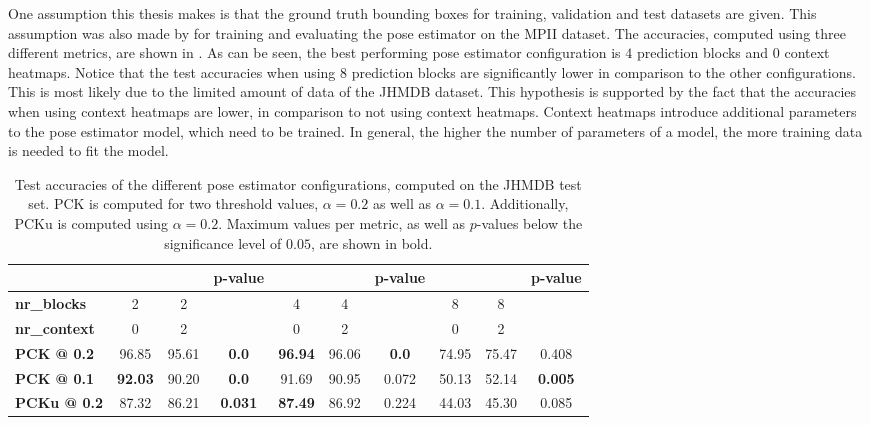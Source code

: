 One assumption this thesis makes is that the ground truth bounding boxes for training, validation and test datasets are given.
This assumption was also made by \cite{luvizon_2d/3d_2018} for training and evaluating the pose estimator on the MPII dataset.
The accuracies, computed using three different metrics, are shown in .
As can be seen, the best performing pose estimator configuration is $4$ prediction blocks and $0$ context heatmaps.
Notice that the test accuracies when using $8$ prediction blocks are significantly lower in comparison to the other configurations.
This is most likely due to the limited amount of data of the JHMDB dataset.
This hypothesis is supported by the fact that the accuracies when using context heatmaps are lower, in comparison to not using context heatmaps.
Context heatmaps introduce additional parameters to the pose estimator model, which need to be trained.
In general, the higher the number of parameters of a model, the more training data is needed to fit the model.

\begin{table}[]
    \small
    \centering
    \begin{tabular}{|l|c|c|c||c|c|c||c|c|c|}
    \hline
        & & & \textbf{p-value} & & & \textbf{p-value} & & & \textbf{p-value} \\ \hline
        \textbf{nr\_blocks} & 2 & 2 &  & 4 & 4 &  & 8 & 8 &  \\ \hline
    \textbf{nr\_context} & 0 & 2 & & 0 & 2 & & 0 & 2 &\\ \hline
        \textbf{PCK @ 0.2} & 96.85 & 95.61 & \textbf{0.0} & \textbf{96.94} & 96.06 & \textbf{0.0} & 74.95 & 75.47 & 0.408 \\ \hline
        \textbf{PCK @ 0.1} & \textbf{92.03} & 90.20 & \textbf{0.0} & 91.69 & 90.95 & 0.072 & 50.13 & 52.14 & \textbf{0.005} \\ \hline
        \textbf{PCKu @ 0.2} & 87.32 & 86.21 & \textbf{0.031} & \textbf{87.49} & 86.92 &  0.224 & 44.03 & 45.30 & 0.085 \\ \hline
    \end{tabular}
    \caption{Test accuracies of the different pose estimator configurations, computed on the JHMDB test set. PCK is computed for two threshold values, $\alpha = 0.2$ as well as $\alpha = 0.1$. Additionally, PCKu is computed using $\alpha = 0.2$. Maximum values per metric, as well as $p$-values below the significance level of $0.05$, are shown in bold.}
    \label{tab:jhmdb_results}
\end{table}


